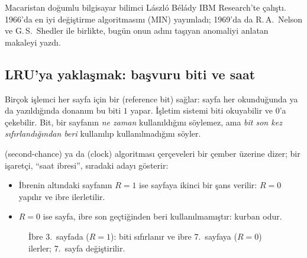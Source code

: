 \begin{histnote}
Macaristan doğumlu bilgisayar bilimci László Bélády IBM Research'te çalıştı. 1966'da en iyi değiştirme algoritmasını (MIN) yayımladı; 1969'da da R.\,A.\ Nelson ve G.\,S.\ Shedler ile birlikte, bugün onun adını taşıyan anomaliyi anlatan makaleyi yazdı.
\end{histnote}

\subsection{LRU'ya yaklaşmak: başvuru biti ve saat}
\label{sec:clock}

Birçok işlemci her sayfa için bir  (reference bit) sağlar: sayfa her okunduğunda ya da yazıldığında donanım bu biti $1$ yapar. İşletim sistemi biti okuyabilir ve $0$'a çekebilir. Bit, bir sayfanın \emph{ne zaman} kullanıldığını söylemez, ama \emph{bit son kez sıfırlandığından beri} kullanılıp kullanılmadığını söyler.

 (second-chance) ya da  (clock) algoritması çerçeveleri bir çember üzerine dizer; bir işaretçi, ``saat ibresi'', sıradaki adayı gösterir:
\begin{itemize}
  \item İbrenin altındaki sayfanın $R = 1$ ise sayfaya ikinci bir şans verilir: $R = 0$ yapılır ve ibre ilerletilir.
  \item $R = 0$ ise sayfa, ibre son geçtiğinden beri kullanılmamıştır: kurban odur.
\end{itemize}

\begin{figure}[H]
\centering
{}
\caption{İbre 3.\ sayfada ($R=1$): biti sıfırlanır ve ibre 7.\ sayfaya ($R=0$) ilerler; 7.\ sayfa değiştirilir.}
\end{figure}

